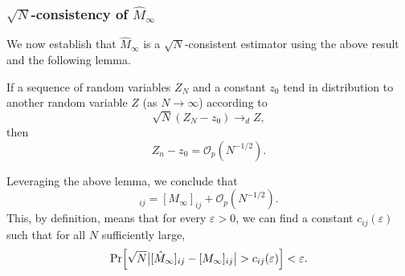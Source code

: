 \documentclass[journal]{IEEEtran}
\newcommand{\hMii}{\hat M_\infty}
\newcommand{\Op}{\mathcal{O}_p}
\begin{document}
\subsubsection{$\sqrt{N}$-consistency of $\hat M_\infty$} We now establish that
$\hMii$ is a $\sqrt{N}$-consistent estimator using the above result and the
following lemma.
\begin{lemma}
    If a sequence of random variables $Z_N$ and a constant $z_0$ tend in
    distribution to another random variable $Z$ (as $N \to \infty$) according
    to
    \begin{equation}
        \sqrt{N}(Z_N - z_0) \to_d Z,
    \end{equation}
    then
    \begin{equation}
        Z_n - z_0 = \Op(N^{-1/2}).
    \end{equation}
\end{lemma}
Leveraging the above lemma, we conclude that
\begin{equation}
    [\hMii]_{ij} = [M_\infty]_{ij} + \mathcal{O}_p(N^{-1/2}).
    \label{eq:ordo_p_theta}
\end{equation}
This, by definition, means that for every $\varepsilon > 0$, we can find
a constant $c_{ij}(\varepsilon)$ such that for all $N$ sufficiently large,
\begin{equation}
    \PR{\sqrt{N} \big| [\hMii]_{ij} - [M_\infty]_{ij} \big| > c_{ij}(\varepsilon)} < \varepsilon.
\end{equation}
\end{document}
